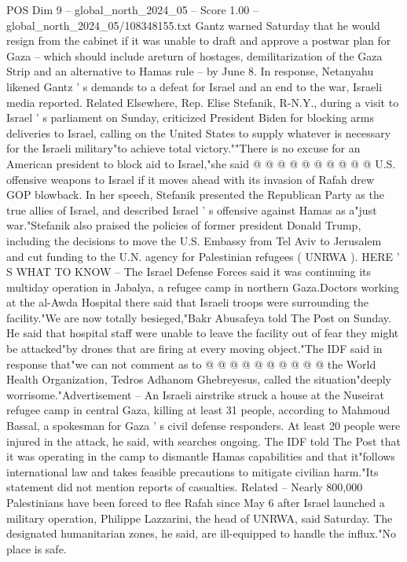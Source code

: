 \begin{textsample}{POS Dim 9 – global\_north\_2024\_05 – Score 1.00 – global\_north\_2024\_05/108348155.txt}
Gantz warned Saturday that he would resign from the cabinet if it was unable to draft and approve a postwar plan for Gaza -- which should include areturn of hostages, demilitarization of the Gaza Strip and an alternative to Hamas rule -- by June 8.
In response, Netanyahu likened Gantz ' s demands to a defeat for Israel and an end to the war, Israeli media reported.
Related Elsewhere, Rep.
Elise Stefanik, R-N.Y., during a visit to Israel ' s parliament on Sunday, criticized President Biden for blocking arms deliveries to Israel, calling on the United States to supply whatever is necessary for the Israeli military"to achieve total victory.""There is no excuse for an American president to block aid to Israel,"she said @ @ @ @ @ @ @ @ @ @ U.S. offensive weapons to Israel if it moves ahead with its invasion of Rafah drew GOP blowback.
In her speech, Stefanik presented the Republican Party as the true allies of Israel, and described Israel ' s offensive against Hamas as a"just war."Stefanik also praised the policies of former president Donald Trump, including the decisions to move the U.S.
Embassy from Tel Aviv to Jerusalem and cut funding to the U.N. agency for Palestinian refugees ( UNRWA ).
HERE ' S WHAT TO KNOW -- The Israel Defense Forces said it was continuing its multiday operation in Jabalya, a refugee camp in northern Gaza.Doctors working at the al-Awda Hospital there said that Israeli troops were surrounding the facility."We are now totally besieged,"Bakr Abusafeya told The Post on Sunday.
He said that hospital staff were unable to leave the facility out of fear they might be attacked"by drones that are firing at every moving object."The IDF said in response that"we can not comment as to @ @ @ @ @ @ @ @ @ @ the World Health Organization, Tedros Adhanom Ghebreyesus, called the situation"deeply worrisome."Advertisement -- An Israeli airstrike struck a house at the Nuseirat refugee camp in central Gaza, killing at least 31 people, according to Mahmoud Bassal, a spokesman for Gaza ' s civil defense responders.
At least 20 people were injured in the attack, he said, with searches ongoing.
The IDF told The Post that it was operating in the camp to dismantle Hamas capabilities and that it"follows international law and takes feasible precautions to mitigate civilian harm."Its statement did not mention reports of casualties.
Related -- Nearly 800,000 Palestinians have been forced to flee Rafah since May 6 after Israel launched a military operation, Philippe Lazzarini, the head of UNRWA, said Saturday.
The designated humanitarian zones, he said, are ill-equipped to handle the influx."No place is safe.

\end{textsample}
